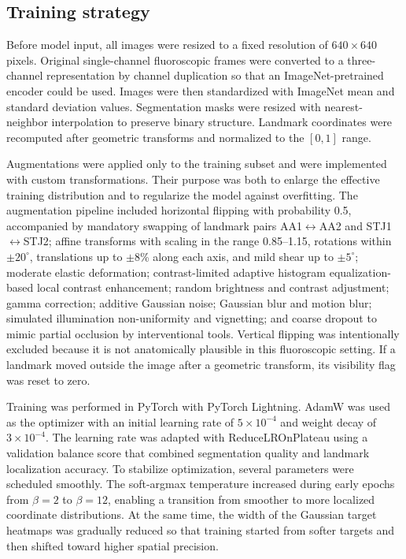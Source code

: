 \documentclass[oneside,pdflatex,sn-mathphys-num]{sn-jnl}
\begin{document}
\subsection{Training strategy}\label{subsec:training}

Before model input, all images were resized to a fixed resolution of $640 \times 640$ pixels. Original single-channel fluoroscopic frames were converted to a three-channel representation by channel duplication so that an ImageNet-pretrained encoder could be used. Images were then standardized with ImageNet mean and standard deviation values. Segmentation masks were resized with nearest-neighbor interpolation to preserve binary structure. Landmark coordinates were recomputed after geometric transforms and normalized to the $[0,1]$ range.

Augmentations were applied only to the training subset and were implemented with custom transformations. Their purpose was both to enlarge the effective training distribution and to regularize the model against overfitting. The augmentation pipeline included horizontal flipping with probability 0.5, accompanied by mandatory swapping of landmark pairs AA1$\leftrightarrow$AA2 and STJ1$\leftrightarrow$STJ2; affine transforms with scaling in the range 0.85--1.15, rotations within $\pm 20^{\circ}$, translations up to $\pm 8$\% along each axis, and mild shear up to $\pm 5^{\circ}$; moderate elastic deformation; contrast-limited adaptive histogram equalization-based local contrast enhancement; random brightness and contrast adjustment; gamma correction; additive Gaussian noise; Gaussian blur and motion blur; simulated illumination non-uniformity and vignetting; and coarse dropout to mimic partial occlusion by interventional tools. Vertical flipping was intentionally excluded because it is not anatomically plausible in this fluoroscopic setting. If a landmark moved outside the image after a geometric transform, its visibility flag was reset to zero.

Training was performed in PyTorch with PyTorch Lightning. AdamW was used as the optimizer with an initial learning rate of $5 \times 10^{-4}$ and weight decay of $3 \times 10^{-4}$. The learning rate was adapted with ReduceLROnPlateau using a validation balance score that combined segmentation quality and landmark localization accuracy. To stabilize optimization, several parameters were scheduled smoothly. The soft-argmax temperature increased during early epochs from $\beta=2$ to $\beta=12$, enabling a transition from smoother to more localized coordinate distributions. At the same time, the width of the Gaussian target heatmaps was gradually reduced so that training started from softer targets and then shifted toward higher spatial precision.
\end{document}
